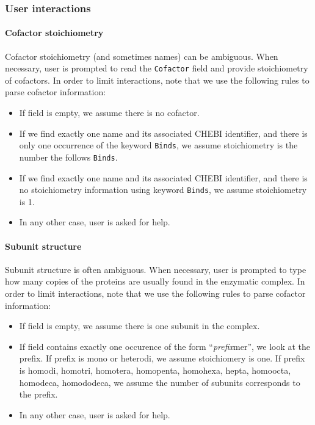
\subsubsection{User interactions}
\paragraph{Cofactor stoichiometry} Cofactor stoichiometry (and sometimes names) can be ambiguous. When necessary, user is prompted to read the \texttt{Cofactor} field and provide stoichiometry of cofactors. In order to limit interactions, note that we use the following rules to parse cofactor information:
\begin{itemize}
\item If field is empty, we assume there is no cofactor.
\item If we find exactly one name and its associated CHEBI identifier, and there is only one occurrence of the keyword \texttt{Binds}, we assume stoichiometry is the number the follows \texttt{Binds}.
\item If we find exactly one name and its associated CHEBI identifier, and there is no stoichiometry information using keyword \texttt{Binds}, we assume stoichiometry is 1.
\item In any other case, user is asked for help.
\end{itemize}

\paragraph{Subunit structure} Subunit structure is often ambiguous. When necessary, user is prompted to type how many copies of the proteins are usually found in the enzymatic complex. In order to limit interactions, note that we use the following rules to parse cofactor information:
\begin{itemize}
\item If field is empty, we assume there is one subunit in the complex.
\item If field contains exactly one occurence of the form ``\textit{prefix}mer'', we look at the prefix. If prefix is mono or heterodi, we assume stoichiomery is one. If prefix is homodi, homotri, homotera, homopenta, homohexa, hepta, homoocta, homodeca, homododeca, we assume the number of subunits corresponds to the prefix.
\item In any other case, user is asked for help.
\end{itemize}

